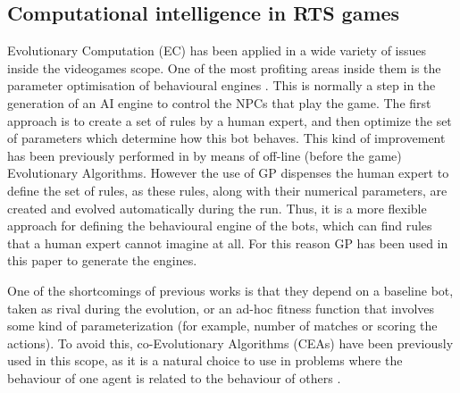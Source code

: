 \documentclass[conference]{IEEEtran}
\begin{document}
\subsection{Computational intelligence in RTS games}
\label{subsec:soa}

Evolutionary Computation (EC) has been applied in a wide variety of issues inside the videogames scope. One of the most profiting areas inside them is the parameter optimisation of behavioural engines \cite{Mora-Evo2010,cooperativebots_CIG2010,Genebot-IWANN2011}.
%
%
This is normally a step in the generation of an AI engine to control the NPCs that play the game. The first approach is to create a set of rules by a human expert, and then optimize the set of parameters which determine how this bot behaves. This kind of improvement has been previously performed in \cite{Genebot_CEC11,genebot-evo12,Genebot_CIG2012,CarSetup} by means of off-line (before the game) Evolutionary Algorithms.
However the use of GP \cite{GarciaGP14,EsparciaGP2013} dispenses the human expert to define the set of rules, as these rules, along with their numerical parameters, are created and evolved automatically during the run.  Thus, it is a more flexible approach for defining the behavioural engine of the bots, which can find rules that a human expert cannot imagine at all. For this reason GP has been used in this paper to generate the engines.


One of the shortcomings of previous works is that they depend on a baseline bot, taken as rival during the evolution, or an ad-hoc fitness function that involves some kind of parameterization (for example, number of matches or scoring the actions). To avoid this, co-Evolutionary Algorithms (CEAs)
have been previously used in this scope, as it is a natural choice to use in problems where the behaviour of one agent is related to the behaviour of others \cite{Coevolving13Samothrakis}.
\end{document}
